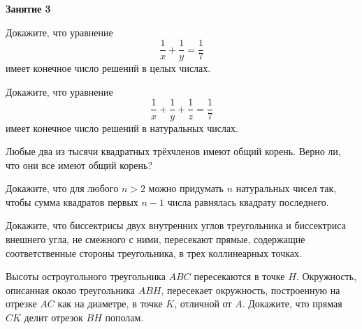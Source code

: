 \documentclass{article}
\begin{document}
    \large

    \begin{center}
        \textbf{Занятие 3}
    \end{center}


    \begin{enumerate_boxed}

        \item Докажите, что уравнение \[\frac{1}{x} + \frac{1}{y} = \frac{1}{7}\] имеет конечное число решений в целых числах.

        \item Докажите, что уравнение \[\frac{1}{x} + \frac{1}{y} + \frac{1}{z} = \frac{1}{7}\] имеет конечное число решений в натуральных числах.

        \item Любые два из тысячи квадратных трёхчленов имеют общий корень.
        Верно ли, что они все имеют общий корень?

        \item Докажите, что для любого $n > 2$ можно придумать $n$ натуральных чисел так, чтобы сумма квадратов первых $n - 1$ числа равнялась квадрату последнего.

        \item Докажите, что биссектрисы двух внутренних углов треугольника и биссектриса
        внешнего угла, не смежного с ними, пересекают прямые, содержащие соответственные стороны треугольника, в трех коллинеарных точках.

        \item Высоты остроугольного треугольника $ABC$ пересекаются в точке $H$.
        Окружность, описанная около треугольника $ABH$, пересекает окружность, построенную на отрезке $AC$ как на диаметре, в точке $K$, отличной от $A$.
        Докажите, что прямая $CK$ делит отрезок $BH$ пополам.

    \end{enumerate_boxed}
\end{document}
